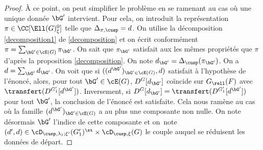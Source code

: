 \begin{proof}
À ce point, on peut simplifier le problème en se ramenant au cas où une unique donnée $\bG'$ intervient. Pour cela, on introduit la représentation $\pi\in \CC[\Ell(G)_{\xi}^0]$ telle que $\Delta_{\pi,\cusp}=d$. On utilise la décomposition \eqref{decomposition1} de \ref{decomposition} et on écrit conformément $\pi=\sum_{\bG'\in \cE(G)}\pi_{\bG'}$. On sait que $\pi_{\bG'}$ satisfait aux les mêmes propriétés que $\pi$ d'après la proposition \ref{decomposition}. On note $d_{\bG'}=\Delta_{\cusp}(\pi_{\bG'})$. On a $d=\sum_{\bG'}d_{\bG'}$. On voit que si $((d^{\bG'})_{\bG'\in \cE(G)},d)$ satisfait à l'hypothèse de l'énoncé, alors, pour tout $\bG'\in \cE(G)$, $D^G[d_{\bG'}]$ coïncide sur $G_{\rell}(F)$ avec $\transfert(D^{G'_{1}}[d^{\bG'}])$. Inversement, si $D^G[d_{\bG'}]=\transfert(D^{G'_{1}}[d^{\bG'}])$ pour tout $\bG'$, la conclusion de l'énoncé est satisfaite. Cela nous ramène au cas où la famille $(d^{\bG'})_{\bG'\in \cE(G)}$ a au plus une composante non nulle. On note désormais $\bG'$ l'indice de cette composante et on~note $(d',d)\in \cD_{\cusp,\lambda_{1};\xi'}(G'_{1})^{\st}\times \cD_{\cusp,\xi}(G)$ le couple auquel se réduisent les données de départ.


\end{proof}
